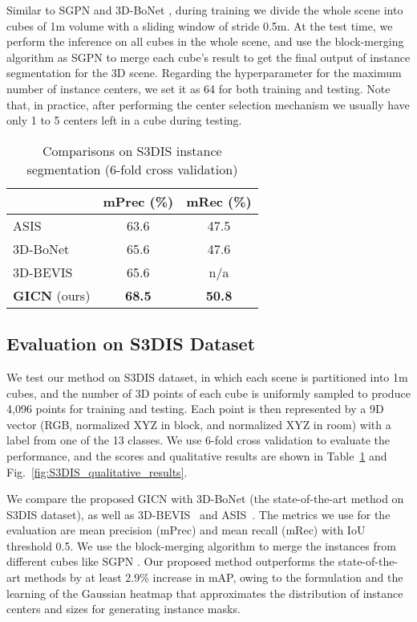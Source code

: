\documentclass[runningheads]{llncs}
\begin{document}
Similar to SGPN \cite{WangYHN18} and 3D-BoNet \cite{YangWCHWMT19}, during training we divide the whole scene into cubes of 1m volume with a sliding window of stride 0.5m. At the test time, we perform the inference on all cubes in the whole scene, and use the block-merging algorithm as SGPN to merge each cube's result to get the final output of instance segmentation for the 3D scene. Regarding the hyperparameter  for the maximum number of instance centers, we set it as 64 for both training and testing. Note that, in practice, after performing the center selection mechanism we usually have only 1 to 5 centers left in a cube during testing.



\begin{table}[tb]
\caption{Comparisons on S3DIS instance segmentation (6-fold cross validation)}
\label{fig:s3dis_performance}
\begin{center}
\centering
\begin{tabular}{|@{\quad}l@{\quad}|@{\quad}c@{\quad}c@{\quad}|} 
\hline
         & mPrec (\%) & mRec (\%)  \\ 
\hline
ASIS \cite{WangLSSJ19}          & 63.6  & 47.5  \\
3D-BoNet  \cite{YangWCHWMT19}   & 65.6  & 47.6  \\
3D-BEVIS \cite{ElichEKL19}      & 65.6  &  n/a   \\
{\bf GICN} (ours)               & {\bf 68.5}  & {\bf 50.8}  \\
\hline
\end{tabular}
\end{center}
\end{table}


\subsection{Evaluation on S3DIS Dataset}
We test our method on S3DIS dataset, in which each scene is partitioned into 1m cubes, and the number of 3D points of each cube is uniformly sampled to produce 4{,}096 points for training and testing. Each point is then represented by a 9D vector (RGB, normalized XYZ in block, and normalized XYZ in room) with a label from one of the 13 classes. We use 6-fold cross validation to evaluate the performance, and the scores and qualitative results are shown in Table~\ref{fig:s3dis_performance} and Fig.~\ref{fig:S3DIS_qualitative_results}. 

We compare the proposed GICN with 3D-BoNet (the state-of-the-art method on S3DIS dataset), as well as 3D-BEVIS~\cite{ElichEKL19}  and ASIS~\cite{WangLSSJ19}. The metrics we use for the evaluation are mean precision (mPrec) and mean recall (mRec) with IoU threshold 0.5. We use the block-merging algorithm to merge the instances from different cubes like SGPN \cite{WangYHN18}.
Our proposed method outperforms the state-of-the-art methods by at least 2.9\% increase in mAP, owing to the formulation and the learning of the Gaussian heatmap that approximates the distribution of instance centers and sizes for generating instance masks.
\end{document}

